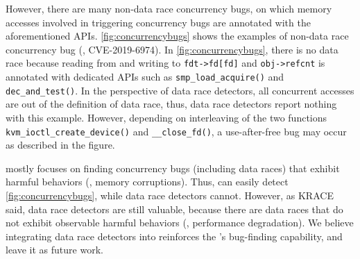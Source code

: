 


%
%
However, there are many non-data race concurrency bugs, on which
memory accesses involved in triggering concurrency bugs are annotated
with the aforementioned APIs.
%
\autoref{fig:concurrencybugs} shows the examples of non-data race
concurrency bug (\ie, CVE-2019-6974).
%
In \autoref{fig:concurrencybugs}, there is no data race because
reading from and writing to \texttt{fdt->fd[fd]} and
\texttt{obj->refcnt} is annotated with dedicated APIs such as
\texttt{smp_load_acquire()} and \texttt{dec_and_test()}.
%
In the perspective of data race detectors, all concurrent accesses are
out of the definition of data race, thus, data race detectors report
nothing with this example.
%
However, depending on interleaving of the two functions
\texttt{kvm_ioctl_create_device()} and \texttt{__close_fd()}, a
use-after-free bug may occur as described in the figure.



%
\sys mostly focuses on finding concurrency bugs (including data races)
that exhibit harmful behaviors (\eg, memory corruptions). Thus, \sys
can easily detect \autoref{fig:concurrencybugs}, while data race
detectors cannot.
%
However, as KRACE said, data race detectors are still valuable,
because there are data races that do not exhibit observable harmful
behaviors (\ie, performance degradation).
%
We believe integrating data race detectors into \sys reinforces the
\sys's bug-finding capability, and leave it as future work.



